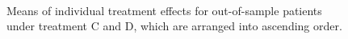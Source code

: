 	\begin{figure}[ht!]
		\begin{center}
			\\
		\end{center}
		\caption{Means of individual treatment effects for out-of-sample patients under treatment C and D, which are arranged into ascending order.}
		\label{fig4_5}
	\end{figure}

